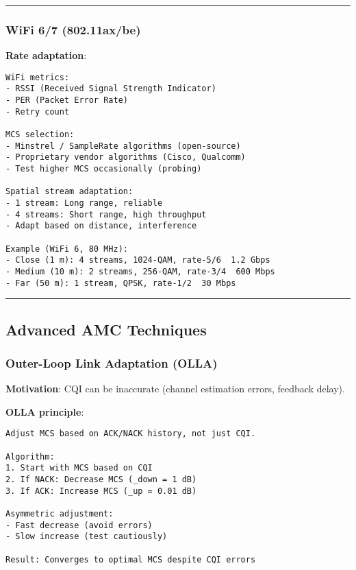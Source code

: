 \begin{center}\rule{0.5\linewidth}{0.5pt}\end{center}

\subsubsection{WiFi 6/7 (802.11ax/be)}\label{wifi-67-802.11axbe}

\textbf{Rate adaptation}:

\begin{verbatim}
WiFi metrics:
- RSSI (Received Signal Strength Indicator)
- PER (Packet Error Rate)
- Retry count

MCS selection:
- Minstrel / SampleRate algorithms (open-source)
- Proprietary vendor algorithms (Cisco, Qualcomm)
- Test higher MCS occasionally (probing)

Spatial stream adaptation:
- 1 stream: Long range, reliable
- 4 streams: Short range, high throughput
- Adapt based on distance, interference

Example (WiFi 6, 80 MHz):
- Close (1 m): 4 streams, 1024-QAM, rate-5/6  1.2 Gbps
- Medium (10 m): 2 streams, 256-QAM, rate-3/4  600 Mbps
- Far (50 m): 1 stream, QPSK, rate-1/2  30 Mbps
\end{verbatim}

\begin{center}\rule{0.5\linewidth}{0.5pt}\end{center}

\subsection{Advanced AMC Techniques}\label{advanced-amc-techniques}

\subsubsection{Outer-Loop Link Adaptation
(OLLA)}\label{outer-loop-link-adaptation-olla}

\textbf{Motivation}: CQI can be inaccurate (channel estimation errors,
feedback delay).

\textbf{OLLA principle}:

\begin{verbatim}
Adjust MCS based on ACK/NACK history, not just CQI.

Algorithm:
1. Start with MCS based on CQI
2. If NACK: Decrease MCS (_down = 1 dB)
3. If ACK: Increase MCS (_up = 0.01 dB)

Asymmetric adjustment:
- Fast decrease (avoid errors)
- Slow increase (test cautiously)

Result: Converges to optimal MCS despite CQI errors
\end{verbatim}


